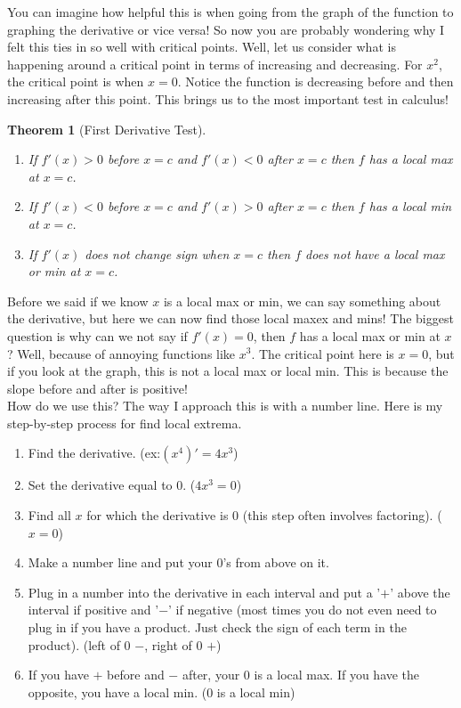\documentclass[10pt]{article}
\theoremstyle{Theorem}
\newtheorem{theorem}{Theorem}[section]
\theoremstyle{definition}
\theoremstyle{remark}
\theoremstyle{custom}
\begin{document}
You can imagine how helpful this is when going from the graph of the function to graphing the derivative or vice versa! So now you are probably wondering why I felt this ties in so well with critical points. Well, let us consider what is happening around a critical point in terms of increasing and decreasing. For $x^2$, the critical point is when $x=0$. Notice the function is decreasing before and then increasing after this point. This brings us to the most important test in calculus!
\begin{theorem}[First Derivative Test]
\begin{enumerate}[1.]
\item If $f'(x)>0$ before $x=c$ and $f'(x)<0$ after $x=c$ then $f$ has a local max at $x=c$.
\item If $f'(x)<0$ before $x=c$ and $f'(x)>0$ after $x=c$ then $f$ has a local min at $x=c$.
\item If $f'(x)$ does not change sign when $x=c$ then $f$ does not have a local max or min at $x=c$.
\end{enumerate}
\end{theorem}
Before we said if we know $x$ is a local max or min, we can say something about the derivative, but here we can now find those local maxex and mins! The biggest question is why can we not say if $f'(x)=0$, then $f$ has a local max or min at $x$? Well, because of annoying functions like $x^3$. The critical point here is $x=0$, but if you look at the graph, this is not a local max or local min. This is because the slope before and after is positive! \\
How do we use this? The way I approach this is with a number line. Here is my step-by-step process for find local extrema.
\begin{enumerate}[1.]
\item Find the derivative. (ex:$(x^4)'=4x^3$)
\item Set the derivative equal to 0. ($4x^3=0$)
\item Find all $x$ for which the derivative is 0 (this step often involves factoring). ($x=0$)
\item Make a number line and put your 0's from above on it. 
\item Plug in a number into the derivative in each interval and put a '$+$' above the interval if positive and '$-$' if negative (most times you do not even need to plug in if you have a product. Just check the sign of each term in the product). (left of 0 $-$, right of 0 $+$)
\item If you have $+$ before and $-$ after, your 0 is a local max. If you have the opposite, you have a local min. (0 is a local min)
\end{enumerate}
\end{document}
